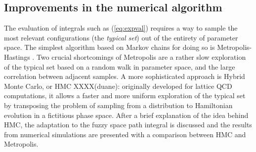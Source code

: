 \subsection{Improvements in the numerical algorithm}
The evaluation of integrals such as (\ref{eq:expval}) requires a way to sample the most relevant configurations (the \textit{typical set}) out of the entirety of parameter space. The simplest algorithm based on Markov chains for doing so is Metropolis-Hastings \cite{hastings}. Two crucial shortcomings of Metropolis are a rather slow exploration of the typical set based on a random walk in parameter space, and the large correlation between adjacent samples. A more sophisticated approach is Hybrid Monte Carlo, or HMC XXXX(duane): originally developed for lattice QCD computations, it allows a faster and more uniform exploration of the typical set by transposing the problem of sampling from a distribution to Hamiltonian evolution in a fictitious phase space.\newline
After a brief explanation of the idea behind HMC, the adaptation to the fuzzy space path integral is discussed and the results from numerical simulations are presented with a comparison between HMC and Metropolis.

